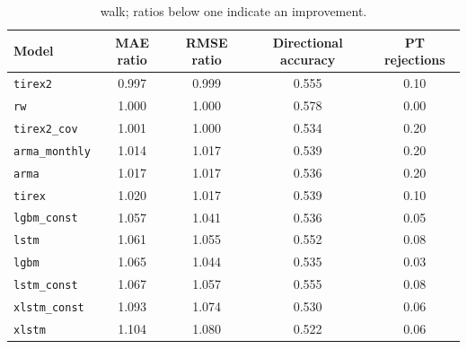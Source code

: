 %
%
%

\begin{table}[t]
\centering
\caption{%
         walk; ratios below one indicate an improvement.}
\label{tab:res_point}
\begin{tabular}{lcccc}
\toprule
Model & MAE ratio & RMSE ratio & Directional accuracy & PT rejections \\
\midrule
\texttt{tirex2}       & 0.997 & 0.999 & 0.555 & 0.10 \\
\texttt{rw}           & 1.000 & 1.000 & 0.578 & 0.00 \\
\texttt{tirex2\_cov}  & 1.001 & 1.000 & 0.534 & 0.20 \\
\texttt{arma\_monthly}& 1.014 & 1.017 & 0.539 & 0.20 \\
\texttt{arma}         & 1.017 & 1.017 & 0.536 & 0.20 \\
\texttt{tirex}        & 1.020 & 1.017 & 0.539 & 0.10 \\
\texttt{lgbm\_const}  & 1.057 & 1.041 & 0.536 & 0.05 \\
\texttt{lstm}         & 1.061 & 1.055 & 0.552 & 0.08 \\
\texttt{lgbm}         & 1.065 & 1.044 & 0.535 & 0.03 \\
\texttt{lstm\_const}  & 1.067 & 1.057 & 0.555 & 0.08 \\
\texttt{xlstm\_const} & 1.093 & 1.074 & 0.530 & 0.06 \\
\texttt{xlstm}        & 1.104 & 1.080 & 0.522 & 0.06 \\
\bottomrule
\end{tabular}
\end{table}


